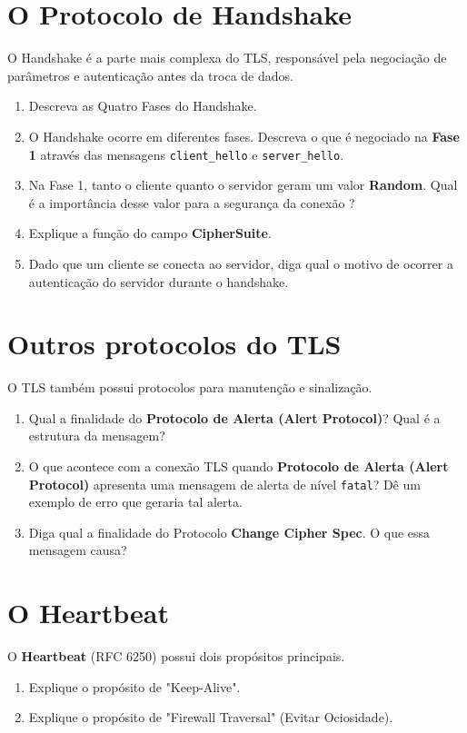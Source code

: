 \section{O Protocolo de Handshake}
O Handshake é a parte mais complexa do TLS, responsável pela negociação de parâmetros e autenticação antes da troca de dados.

\begin{enumerate}
    \item Descreva as Quatro Fases do Handshake.
    \item O Handshake ocorre em diferentes fases. Descreva o que é negociado na \textbf{Fase 1} através das mensagens \texttt{client\_hello} e \texttt{server\_hello}.
    \item Na Fase 1, tanto o cliente quanto o servidor geram um valor \textbf{Random}. Qual é a importância desse valor para a segurança da conexão ?
    \item Explique a função do campo \textbf{CipherSuite}.
    \item Dado que um cliente se conecta ao servidor, diga qual o motivo de ocorrer a autenticação do servidor durante o handshake.
\end{enumerate}


\section{Outros protocolos do TLS}
O TLS também possui protocolos para manutenção e sinalização.

\begin{enumerate}
    \item Qual a finalidade do \textbf{Protocolo de Alerta (Alert Protocol)}? Qual é a estrutura da mensagem?
    \item O que acontece com a conexão TLS quando \textbf{Protocolo de Alerta (Alert Protocol)} apresenta uma mensagem de alerta de nível \texttt{fatal}? Dê um exemplo de erro que geraria tal alerta.
    \item Diga qual a finalidade do Protocolo \textbf{Change Cipher Spec}. O que essa mensagem causa?
\end{enumerate}



\section{O Heartbeat}
O \textbf{Heartbeat} (RFC 6250) possui dois propósitos principais.
\begin{enumerate}
    \item Explique o propósito de "Keep-Alive".
    \item Explique o propósito de "Firewall Traversal" (Evitar Ociosidade).
\end{enumerate}

